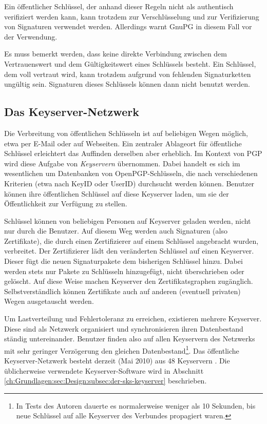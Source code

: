 Ein öffentlicher Schlüssel, der anhand dieser Regeln nicht als
authentisch verifiziert werden kann, kann trotzdem zur Verschlüsselung
und zur Verifizierung von Signaturen verwendet werden. Allerdings
warnt GnuPG in diesem Fall vor der Verwendung.

Es muss bemerkt werden, dass keine direkte Verbindung zwischen dem
Vertrauenswert und dem Gültigkeitswert eines Schlüssels
besteht. Ein Schlüssel, dem voll vertraut wird, kann trotzdem
aufgrund von fehlenden Signaturketten ungültig sein. Signaturen
dieses Schlüssels können dann nicht benutzt werden.

\subsection{Das Keyserver-Netzwerk}
\label{sec:das-keys-netzw}

Die Verbreitung von öffentlichen Schlüsseln ist auf beliebigen Wegen
möglich, etwa per E-Mail oder auf Webseiten. Ein zentraler Ablageort
für öffentliche Schlüssel erleichtert das Auffinden derselben aber
erheblich. Im Kontext von PGP wird diese Aufgabe von \emph{Keyservern}
übernommen. Dabei handelt es sich im wesentlichen um Datenbanken von
OpenPGP-Schlüsseln, die nach verschiedenen Kriterien (etwa nach KeyID
oder UserID) durchsucht werden können. Benutzer können ihre
öffentlichen Schl\"ussel auf diese Keyserver laden, um sie der
Öffentlichkeit zur Verfügung zu stellen.

Schlüssel können von beliebigen Personen auf Keyserver geladen
werden, nicht nur durch die Benutzer. Auf diesem Weg werden auch
Signaturen (also Zertifikate), die durch einen Zertifizierer auf einem
Schlüssel angebracht wurden, verbreitet. Der Zertifizierer lädt
den veränderten Schlüssel auf einen Keyserver. Dieser fügt die
neuen Signaturpakete dem bisherigen Schlüssel hinzu. Dabei werden
stets nur Pakete zu Schlüsseln hinzugefügt, nicht überschrieben
oder gelöscht. Auf diese Weise machen Keyserver den
Zertifikatsgraphen zugänglich. Selbstverständlich können
Zertifikate auch auf anderen (eventuell privaten) Wegen ausgetauscht
werden.

Um Lastverteilung und Fehlertoleranz zu erreichen, existieren mehrere
Keyserver. Diese sind als Netzwerk organisiert und synchronisieren
ihren Datenbestand ständig untereinander. Benutzer finden also auf
allen Keyservern des Netzwerks mit sehr geringer Verzögerung den
gleichen Datenbestand\footnote{In Tests des Autoren dauerte es
  normalerweise weniger als 10 Sekunden, bis neue Schlüssel auf alle
  Keyserver des Verbundes propagiert waren.}. Das öffentliche
Keyserver-Netzwerk besteht derzeit (Mai 2010) aus 48
Keyservern \cite{SKS}. Die üblicherweise
verwendete Keyserver-Software wird in Abschnitt
\ref{ch:Grundlagen:sec:Design:subsec:der-sks-keyserver} beschrieben.

